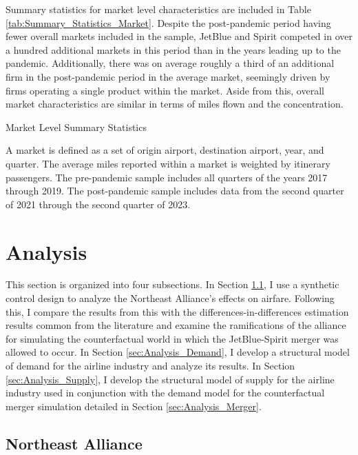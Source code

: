 \documentclass{article}
\let\Oldsubsection\subsection
\renewcommand{\subsection}{\FloatBarrier\Oldsubsection}
\begin{document}
    Summary statistics for market level characteristics are included in Table \ref{tab:Summary_Statistics_Market}. Despite the post-pandemic period having fewer overall markets included in the sample, JetBlue and Spirit competed in over a hundred additional markets in this period than in the years leading up to the pandemic. Additionally, there was on average roughly a third of an additional firm in the post-pandemic period in the average market, seemingly driven by firms operating a single product within the market. Aside from this, overall market characteristics are similar in terms of miles flown and the concentration. 

    \begin{table}
        \caption{Market Level Summary Statistics}
        \label{tab:Summary_Statistics_Market}
        
        \footnotesize{A market is defined as a set of origin airport, destination airport, year, and quarter. The average miles reported within a market is weighted by itinerary passengers. The pre-pandemic sample includes all quarters of the years 2017 through 2019. The post-pandemic sample includes data from the second quarter of 2021 through the second quarter of 2023. }
    \end{table}

	\section{Analysis}
	\label{sec:Analysis}
	
	This section is organized into four subsections. In Section \ref{sec:Analysis_NEA}, I use a synthetic control design to analyze the Northeast Alliance's effects on airfare. Following this, I compare the results from this with the differences-in-differences estimation results common from the literature and examine the ramifications of the alliance for simulating the counterfactual world in which the JetBlue-Spirit merger was allowed to occur. In Section \ref{sec:Analysis_Demand}, I develop a structural model of demand for the airline industry and analyze its results. In Section \ref{sec:Analysis_Supply}, I develop the structural model of supply for the airline industry used in conjunction with the demand model for the counterfactual merger simulation detailed in Section \ref{sec:Analysis_Merger}. 
	
	\subsection{Northeast Alliance}
	\label{sec:Analysis_NEA}
\end{document}
